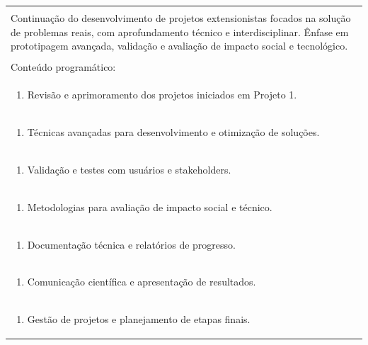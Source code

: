 \documentclass[11pt]{article}
\begin{document}
\begin{center}
\begin{longtable}{|p{4cm}|p{4cm}|p{4cm}|p{4cm}|}
\multicolumn{4}{|p{16cm}|}{}\\
\multicolumn{4}{|p{\dimexpr 16cm + 6\tabcolsep\relax}|}{Continuação do desenvolvimento de projetos extensionistas focados na solução de problemas reais, com aprofundamento técnico e interdisciplinar. Ênfase em prototipagem avançada, validação e avaliação de impacto social e tecnológico.}\\
\multicolumn{4}{|p{16cm}|}{}\\
\hline
\multicolumn{4}{|p{16cm}|}{Conteúdo programático:}\\*
\multicolumn{4}{|p{\dimexpr 16cm + 6\tabcolsep\relax}|}{\begin{enumerate}[start=1]\item Revisão e aprimoramento dos projetos iniciados em Projeto 1.\end{enumerate}}\\
\multicolumn{4}{|p{\dimexpr 16cm + 6\tabcolsep\relax}|}{\begin{enumerate}[start=2]\item Técnicas avançadas para desenvolvimento e otimização de soluções.\end{enumerate}}\\
\multicolumn{4}{|p{\dimexpr 16cm + 6\tabcolsep\relax}|}{\begin{enumerate}[start=3]\item Validação e testes com usuários e stakeholders.\end{enumerate}}\\
\multicolumn{4}{|p{\dimexpr 16cm + 6\tabcolsep\relax}|}{\begin{enumerate}[start=4]\item Metodologias para avaliação de impacto social e técnico.\end{enumerate}}\\
\multicolumn{4}{|p{\dimexpr 16cm + 6\tabcolsep\relax}|}{\begin{enumerate}[start=5]\item Documentação técnica e relatórios de progresso.\end{enumerate}}\\
\multicolumn{4}{|p{\dimexpr 16cm + 6\tabcolsep\relax}|}{\begin{enumerate}[start=6]\item Comunicação científica e apresentação de resultados.\end{enumerate}}\\
\multicolumn{4}{|p{\dimexpr 16cm + 6\tabcolsep\relax}|}{\begin{enumerate}[start=7]\item Gestão de projetos e planejamento de etapas finais.\end{enumerate}}\\

\end{longtable}
\end{center}
\end{document}
